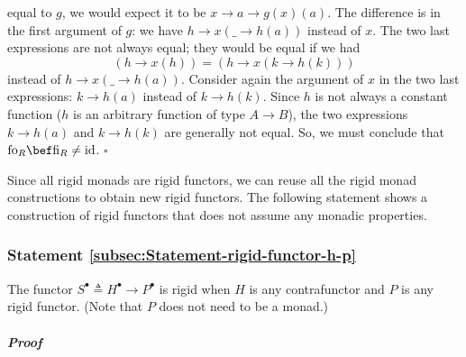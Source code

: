equal to $g$, we would expect it to be $x\rightarrow a\rightarrow g(x)(a)$.
The difference is in the first argument of $g$: we have $h\rightarrow x(\_\rightarrow h(a))$
instead of $x$. The two last expressions are not always equal; they
would be equal if we had 
\[
\left(h\rightarrow x(h)\right)=\left(h\rightarrow x(k\rightarrow h(k))\right)
\]
instead of $h\rightarrow x(\_\rightarrow h(a))$. Consider again the
argument of $x$ in the two last expressions: $k\rightarrow h(a)$
instead of $k\rightarrow h(k)$. Since $h$ is not always a constant
function ($h$ is an arbitrary function of type $A\rightarrow B$),
the two expressions $k\rightarrow h(a)$ and $k\rightarrow h(k)$
are generally not equal. So, we must conclude that $\text{fo}_{R}\bef\text{fi}_{R}\neq\text{id}$.
$\square$

Since all rigid monads are rigid functors, we can reuse all the rigid
monad constructions to obtain new rigid functors. The following statement
shows a construction of rigid functors that does not assume any monadic
properties. 

\subsubsection{Statement \label{subsec:Statement-rigid-functor-h-p}\ref{subsec:Statement-rigid-functor-h-p}}

The functor $S^{\bullet}\triangleq H^{\bullet}\rightarrow P^{\bullet}$
is rigid when $H$ is any contrafunctor and $P$ is any rigid functor.
(Note that $P$ does not need to be a monad.)

\subparagraph{Proof}

